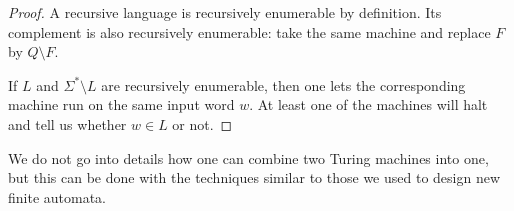 \begin{proof}
A recursive language is recursively enumerable by definition.
Its complement is also recursively enumerable: take the same machine and replace $F$ by $Q \setminus F$.

If $L$ and $\Sigma^* \setminus L$ are recursively enumerable,
then one lets the corresponding machine run on the same input word $w$.
At least one of the machines will halt and tell us whether $w \in L$ or not.
\end{proof}

We do not go into details how one can combine two Turing machines into one,
but this can be done with the techniques similar to those we used to design new finite automata.

